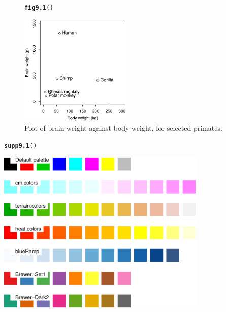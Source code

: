 \documentclass[12pt, a4paper,  BCOR=8.25mm, DIV=15]{scrartcl}\usepackage[]{graphicx}\usepackage[]{color}
\makeatletter
\newcommand{\hlstd}[1]{\textcolor[rgb]{0.345,0.345,0.345}{#1}}%
\newcommand{\hlkwd}[1]{\textcolor[rgb]{0.737,0.353,0.396}{\textbf{#1}}}%
\newenvironment{kframe}{%
 \def\at@end@of@kframe{}%
 \ifinner\ifhmode%
  \def\at@end@of@kframe{\end{minipage}}%
  \begin{minipage}{\columnwidth}%
 \fi\fi%
 \def\FrameCommand##1{\hskip\@totalleftmargin \hskip-\fboxsep
 \colorbox{shadecolor}{##1}\hskip-\fboxsep
     \hskip-\linewidth \hskip-\@totalleftmargin \hskip\columnwidth}%
 \MakeFramed {\advance\hsize-\width
   \@totalleftmargin\z@ \linewidth\hsize
   \@setminipage}}%
 {\par\unskip\endMakeFramed%
 \at@end@of@kframe}
\newenvironment{knitrout}{}{} %
\makeatother
\begin{document}
\begin{figure}[ht]
\begin{knitrout}
\color{fgcolor}\begin{kframe}
\begin{alltt}
\hlkwd{fig9.1}\hlstd{()}
\end{alltt}
\end{kframe}

{\centering \includegraphics[width=0.47\textwidth]{figs/gph-fig9_1e-1} 

}



\end{knitrout}
\caption{Plot of brain weight against body weight, for selected
primates.}\label{fig:primates}
\end{figure}

\begin{suppfigure}[ht]
\begin{knitrout}
\color{fgcolor}\begin{kframe}
\begin{alltt}
\hlkwd{supp9.1}\hlstd{()}
\end{alltt}
\end{kframe}

{\centering \includegraphics[width=0.75\textwidth]{figs/gph-supp9_1e-1} 

}



\end{knitrout}
\caption{Color palettes.}\label{fig:colpal}
\end{suppfigure}
\end{document}
